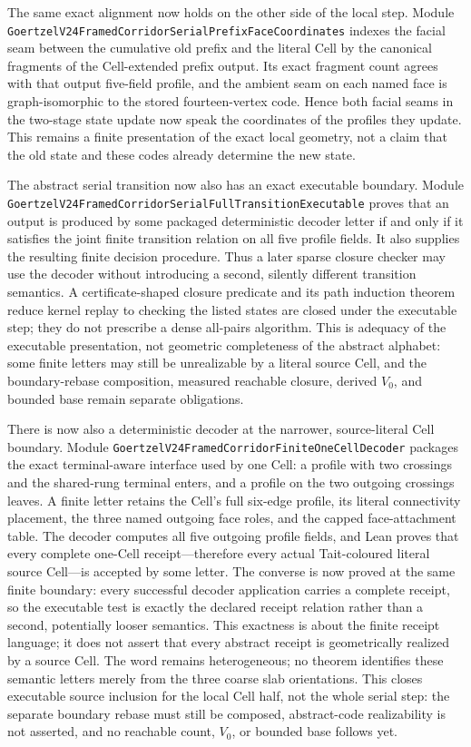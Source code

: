 \documentclass[11pt]{article}
\theoremstyle{definition}
\begin{document}
The same exact alignment now holds on the other side of the local step.
Module
\texttt{GoertzelV24FramedCorridorSerialPrefixFaceCoordinates} indexes the
facial seam between the cumulative old prefix and the literal Cell by the
canonical fragments of the Cell-extended prefix output.  Its exact fragment
count agrees with that output five-field profile, and the ambient seam on each
named face is graph-isomorphic to the stored fourteen-vertex code.  Hence both
facial seams in the two-stage state update now speak the coordinates of the
profiles they update.  This remains a finite presentation of the exact local
geometry, not a claim that the old state and these codes already determine the
new state.

The abstract serial transition now also has an exact executable boundary.
Module
\texttt{GoertzelV24FramedCorridorSerialFullTransitionExecutable} proves that
an output is produced by some packaged deterministic decoder letter if and
only if it satisfies the joint finite transition relation on all five profile
fields.  It also supplies the resulting finite decision procedure.  Thus a
later sparse closure checker may use the decoder without introducing a second,
silently different transition semantics.  A certificate-shaped closure
predicate and its path induction theorem reduce kernel replay to checking the
listed states are closed under the executable step; they do not prescribe a
dense all-pairs algorithm.  This is adequacy of the executable
presentation, not geometric completeness of the abstract alphabet: some
finite letters may still be unrealizable by a literal source Cell, and the
boundary-rebase composition, measured reachable closure, derived $V_0$, and
bounded base remain separate obligations.

There is now also a deterministic decoder at the narrower, source-literal
Cell boundary.  Module
\texttt{GoertzelV24FramedCorridorFiniteOneCellDecoder} packages the exact
terminal-aware interface used by one Cell: a profile with two crossings and
the shared-rung terminal enters, and a profile on the two outgoing crossings
leaves.  A finite letter retains the Cell's full six-edge profile, its literal
connectivity placement, the three named outgoing face roles, and the capped
face-attachment table.  The decoder computes all five outgoing profile
fields, and Lean proves that every complete one-Cell receipt---therefore every
actual Tait-coloured literal source Cell---is accepted by some letter.  The
converse is now proved at the same finite boundary: every successful decoder
application carries a complete receipt, so the executable test is exactly the
declared receipt relation rather than a second, potentially looser semantics.
This exactness is about the finite receipt language; it does not assert that
every abstract receipt is geometrically realized by a source Cell.  The
word remains heterogeneous; no theorem identifies these semantic letters
merely from the three coarse slab orientations.  This closes executable
source inclusion for the local Cell half, not the whole serial step: the
separate boundary rebase must still be composed, abstract-code realizability
is not asserted, and no reachable count, $V_0$, or bounded base follows yet.
\end{document}
